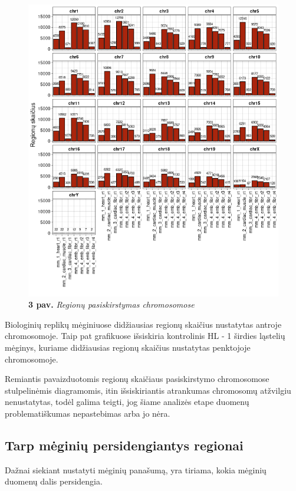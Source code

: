 \documentclass[12pt]{article}
\begin{document}
\begin{figure}[htb]
    \begin{center}
        \includegraphics[width=0.8\linewidth]{../Figures/peak_counts_by_chromosome.png}
        \caption*{\textbf{3 pav.} \emph{Regionų pasiskirstymas chromosomose}}
    \end{center}
\end{figure}

Biologinių replikų mėginiuose didžiausias regionų skaičius
nustatytas antroje chromosomoje. Taip pat grafikuose išsiskiria
kontrolinis HL - 1 širdies ląstelių mėginys, kuriame didžiausias
regionų skaičius nustatytas penktojoje chromosomoje.

Remiantis pavaizduotomis regionų skaičiaus pasiskirstymo
chromosomose stulpelinėmis diagramomis, itin išsiskiriantis
atrankumas chromosomų atžvilgiu nenustatytas, todėl galima
teigti, jog šiame analizės etape duomenų problematiškumas
nepastebimas arba jo nėra.

\newpage

\subsection{Tarp mėginių persidengiantys regionai}
Dažnai siekiant nustatyti mėginių panašumą, yra tiriama, kokia
mėginių duomenų dalis persidengia.
\end{document}
